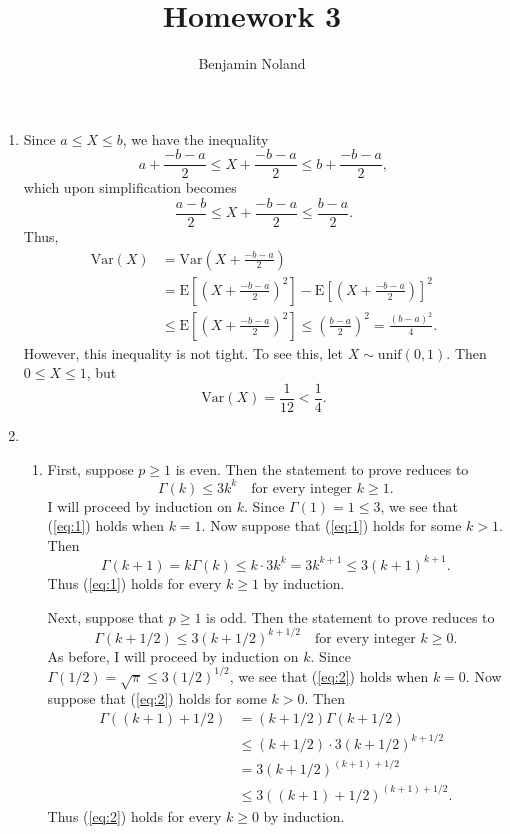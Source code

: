 \documentclass[12pt]{article}
\title{Homework 3}
\author{Benjamin Noland}
\date{}
\newcommand{\E}{\mathrm{E}}
\newcommand{\Var}{\mathrm{Var}}
\begin{document}
\maketitle

\begin{enumerate}
\item
Since $a \leq X \leq b$, we have the inequality
\begin{equation*}
a + \frac{-b-a}{2} \leq X + \frac{-b-a}{2} \leq b + \frac{-b-a}{2},
\end{equation*}
which upon simplification becomes
\begin{equation*}
\frac{a-b}{2} \leq X + \frac{-b-a}{2} \leq \frac{b-a}{2}.
\end{equation*}
Thus,
\begin{align*}
\Var(X) &= \Var\left(X + \frac{-b-a}{2}\right) \\
&= \E\left[\left(X + \frac{-b-a}{2}\right)^2\right] - \E\left[\left(X + \frac{-b-a}{2}\right)\right]^2 \\
&\leq \E\left[\left(X + \frac{-b-a}{2}\right)^2\right] \leq \left(\frac{b-a}{2}\right)^2 = \frac{(b-a)^2}{4}.
\end{align*}
However, this inequality is not tight. To see this, let $X \sim \mathrm{unif}(0, 1)$. Then $0 \leq X \leq 1$, but
\begin{equation*}
\Var(X) = \frac{1}{12} < \frac{1}{4}.
\end{equation*}

\item
\begin{enumerate}[label=(\roman*)]
\item
First, suppose $p \geq 1$ is even. Then the statement to prove reduces to
\begin{equation} \label{eq:1}
\Gamma(k) \leq 3k^k \quad \text{for every integer $k \geq 1$}.
\end{equation}
I will proceed by induction on $k$. Since $\Gamma(1) = 1 \leq 3$, we see that (\ref{eq:1}) holds when $k = 1$. Now suppose that (\ref{eq:1}) holds for some $k > 1$. Then
\begin{equation*}
\Gamma(k+1) = k\Gamma(k) \leq k \cdot 3k^k = 3k^{k+1} \leq 3(k+1)^{k+1}.
\end{equation*}
Thus (\ref{eq:1}) holds for every $k \geq 1$ by induction.

Next, suppose that $p \geq 1$ is odd. Then the statement to prove reduces to
\begin{equation} \label{eq:2}
\Gamma(k+1/2) \leq 3(k+1/2)^{k+1/2} \quad \text{for every integer $k \geq 0$}.
\end{equation}
As before, I will proceed by induction on $k$. Since $\Gamma(1/2) = \sqrt{\pi} \leq 3(1/2)^{1/2}$, we see that (\ref{eq:2}) holds when $k = 0$. Now suppose that (\ref{eq:2}) holds for some $k > 0$. Then
\begin{align*}
\Gamma((k+1) + 1/2) &= (k+1/2)\Gamma(k+1/2) \\
&\leq (k+1/2) \cdot 3(k+1/2)^{k+1/2} \\
&= 3(k+1/2)^{(k+1) + 1/2} \\
&\leq 3((k+1)+1/2)^{(k+1) + 1/2}.
\end{align*}
Thus (\ref{eq:2}) holds for every $k \geq 0$ by induction.


\end{enumerate}
\end{enumerate}
\end{document}
